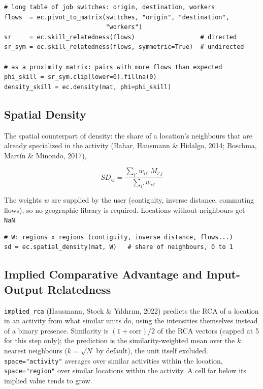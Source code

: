 \documentclass[12pt, a4paper]{article}
\newcommand{\fn}[1]{\texttt{#1}}
\begin{document}
\begin{lstlisting}[caption={Skill relatedness from job switches}]
# long table of job switches: origin, destination, workers
flows  = ec.pivot_to_matrix(switches, "origin", "destination",
                            "workers")
sr     = ec.skill_relatedness(flows)                  # directed
sr_sym = ec.skill_relatedness(flows, symmetric=True)  # undirected

# as a proximity matrix: pairs with more flows than expected
phi_skill = sr_sym.clip(lower=0).fillna(0)
density_skill = ec.density(mat, phi=phi_skill)
\end{lstlisting}

\subsection{Spatial Density}

The spatial counterpart of density: the share of a location's neighbours
that are already specialized in the activity (Bahar, Hausmann \& Hidalgo,
2014; Boschma, Mart\'{i}n \& Minondo, 2017),

\[
  SD_{ij} = \frac{\sum_{i'} w_{ii'}\,M_{i'j}}{\sum_{i'} w_{ii'}}
\]

The weights $w$ are supplied by the user (contiguity, inverse distance,
commuting flows), so no geographic library is required. Locations
without neighbours get \texttt{NaN}.

\begin{lstlisting}[caption={Spatial density}]
# W: regions x regions (contiguity, inverse distance, flows...)
sd = ec.spatial_density(mat, W)   # share of neighbours, 0 to 1
\end{lstlisting}

\subsection{Implied Comparative Advantage and Input-Output Relatedness}

\begin{sloppypar}
\fn{implied\_rca} (Hausmann, Stock \& Y{\i}ld{\i}r{\i}m, 2022) predicts the
RCA of a location in an activity from what similar units do, using the
intensities themselves instead of a binary presence. Similarity is
$(1 + \text{corr})/2$ of the RCA vectors (capped at 5 for this step
only); the prediction is the similarity-weighted mean over the $k$
nearest neighbours ($k = \sqrt{N}$ by default), the unit itself
excluded. \texttt{space="activity"} averages over similar activities
within the location, \texttt{space="region"} over similar locations
within the activity. A cell far below its implied value tends to grow.
\end{sloppypar}
\end{document}
